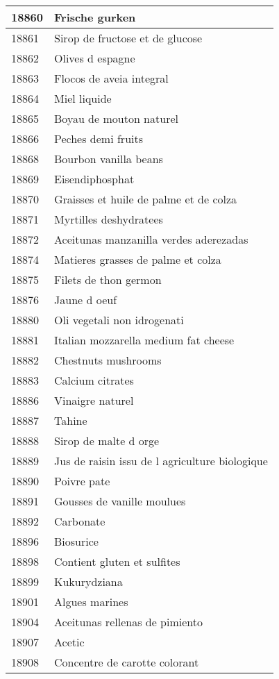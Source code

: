 \begin{longtable}{|l|l|}
18860 & Frische gurken \\ \hline 
18861 & Sirop de fructose et de glucose \\ \hline 
18862 & Olives d espagne \\ \hline 
18863 & Flocos de aveia integral \\ \hline 
18864 & Miel liquide \\ \hline 
18865 & Boyau de mouton naturel \\ \hline 
18866 & Peches demi fruits \\ \hline 
18868 & Bourbon vanilla beans \\ \hline 
18869 & Eisendiphosphat \\ \hline 
18870 & Graisses et huile de palme et de colza \\ \hline 
18871 & Myrtilles deshydratees \\ \hline 
18872 & Aceitunas manzanilla verdes aderezadas \\ \hline 
18874 & Matieres grasses de palme et colza \\ \hline 
18875 & Filets de thon germon \\ \hline 
18876 & Jaune d oeuf \\ \hline 
18880 & Oli vegetali non idrogenati \\ \hline 
18881 & Italian mozzarella medium fat cheese \\ \hline 
18882 & Chestnuts mushrooms \\ \hline 
18883 & Calcium citrates \\ \hline 
18886 & Vinaigre naturel \\ \hline 
18887 & Tahine \\ \hline 
18888 & Sirop de malte d orge \\ \hline 
18889 & Jus de raisin issu de l agriculture biologique \\ \hline 
18890 & Poivre pate \\ \hline 
18891 & Gousses de vanille moulues \\ \hline 
18892 & Carbonate \\ \hline 
18896 & Biosurice \\ \hline 
18898 & Contient gluten et sulfites \\ \hline 
18899 & Kukurydziana \\ \hline 
18901 & Algues marines \\ \hline 
18904 & Aceitunas rellenas de pimiento \\ \hline 
18907 & Acetic \\ \hline 
18908 & Concentre de carotte colorant \\ \hline 

\end{longtable}
